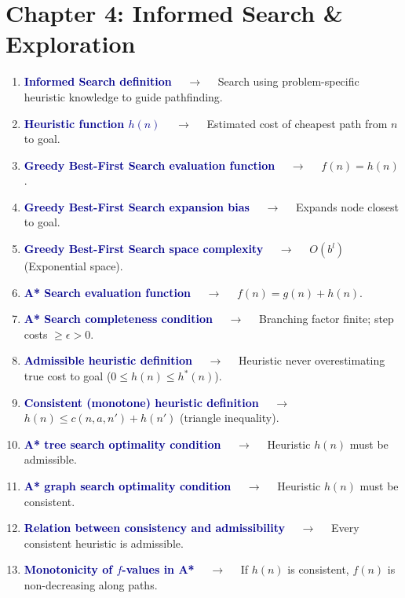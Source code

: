 \documentclass[11pt,a4paper]{article}
\begin{document}
\section*{Chapter 4: Informed Search \& Exploration}

\begin{enumerate}[label=\arabic*., leftmargin=*, labelsep=0.8em, itemsep=0.35em, parsep=0.1em, topsep=0.2em]
  \item \textcolor{darkblue}{\textbf{Informed Search definition}} $\quad\to\quad$ Search using problem-specific heuristic knowledge to guide pathfinding.
  \item \textcolor{darkblue}{\textbf{Heuristic function $h(n)$}} $\quad\to\quad$ Estimated cost of cheapest path from $n$ to goal.
  \item \textcolor{darkblue}{\textbf{Greedy Best-First Search evaluation function}} $\quad\to\quad$ $f(n)=h(n)$.
  \item \textcolor{darkblue}{\textbf{Greedy Best-First Search expansion bias}} $\quad\to\quad$ Expands node closest to goal.
  \item \textcolor{darkblue}{\textbf{Greedy Best-First Search space complexity}} $\quad\to\quad$ $O(b^l)$ (Exponential space).
  \item \textcolor{darkblue}{\textbf{A* Search evaluation function}} $\quad\to\quad$ $f(n)=g(n)+h(n)$.
  \item \textcolor{darkblue}{\textbf{A* Search completeness condition}} $\quad\to\quad$ Branching factor finite; step costs $\ge\epsilon>0$.
  \item \textcolor{darkblue}{\textbf{Admissible heuristic definition}} $\quad\to\quad$ Heuristic never overestimating true cost to goal ($0\le h(n)\le h^*(n)$).
  \item \textcolor{darkblue}{\textbf{Consistent (monotone) heuristic definition}} $\quad\to\quad$ $h(n)\le c(n,a,n')+h(n')$ (triangle inequality).
  \item \textcolor{darkblue}{\textbf{A* tree search optimality condition}} $\quad\to\quad$ Heuristic $h(n)$ must be admissible.
  \item \textcolor{darkblue}{\textbf{A* graph search optimality condition}} $\quad\to\quad$ Heuristic $h(n)$ must be consistent.
  \item \textcolor{darkblue}{\textbf{Relation between consistency and admissibility}} $\quad\to\quad$ Every consistent heuristic is admissible.
  \item \textcolor{darkblue}{\textbf{Monotonicity of $f$-values in A*}} $\quad\to\quad$ If $h(n)$ is consistent, $f(n)$ is non-decreasing along paths.

\end{enumerate}
\end{document}

